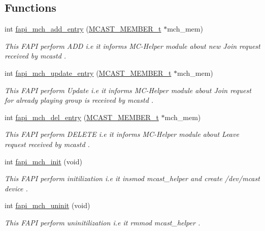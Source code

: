 \subsection*{Functions}
\begin{DoxyCompactItemize}
\item 
int \hyperlink{group__FAPI__MCAST_gafbac858165d5e50aa73d570f1126d239}{fapi\-\_\-mch\-\_\-add\-\_\-entry} (\hyperlink{structMCAST__MEMBER__t}{M\-C\-A\-S\-T\-\_\-\-M\-E\-M\-B\-E\-R\-\_\-t} $\ast$mch\-\_\-mem)
\begin{DoxyCompactList}\small\item\em This F\-A\-P\-I perform A\-D\-D i.\-e it informs M\-C-\/\-Helper module about new Join request received by mcastd . \end{DoxyCompactList}\item 
int \hyperlink{group__FAPI__MCAST_ga6286c923439cc8e19147947793d93b5f}{fapi\-\_\-mch\-\_\-update\-\_\-entry} (\hyperlink{structMCAST__MEMBER__t}{M\-C\-A\-S\-T\-\_\-\-M\-E\-M\-B\-E\-R\-\_\-t} $\ast$mch\-\_\-mem)
\begin{DoxyCompactList}\small\item\em This F\-A\-P\-I perform Update i.\-e it informs M\-C-\/\-Helper module about Join request for already playing group is received by mcastd . \end{DoxyCompactList}\item 
int \hyperlink{group__FAPI__MCAST_ga5bcc01589f050c9a2ab598448541409e}{fapi\-\_\-mch\-\_\-del\-\_\-entry} (\hyperlink{structMCAST__MEMBER__t}{M\-C\-A\-S\-T\-\_\-\-M\-E\-M\-B\-E\-R\-\_\-t} $\ast$mch\-\_\-mem)
\begin{DoxyCompactList}\small\item\em This F\-A\-P\-I perform D\-E\-L\-E\-T\-E i.\-e it informs M\-C-\/\-Helper module about Leave request received by mcastd . \end{DoxyCompactList}\item 
int \hyperlink{group__FAPI__MCAST_ga273dfc7cf664728003a52ec6956baf58}{fapi\-\_\-mch\-\_\-init} (void)
\begin{DoxyCompactList}\small\item\em This F\-A\-P\-I perform initilization i.\-e it insmod mcast\-\_\-helper and create /dev/mcast device . \end{DoxyCompactList}\item 
int \hyperlink{group__FAPI__MCAST_ga2bbfa1785e9b2b44cdcc3ed12497aa45}{fapi\-\_\-mch\-\_\-uninit} (void)
\begin{DoxyCompactList}\small\item\em This F\-A\-P\-I perform uninitilization i.\-e it rmmod mcast\-\_\-helper . \end{DoxyCompactList}\end{DoxyCompactItemize}


